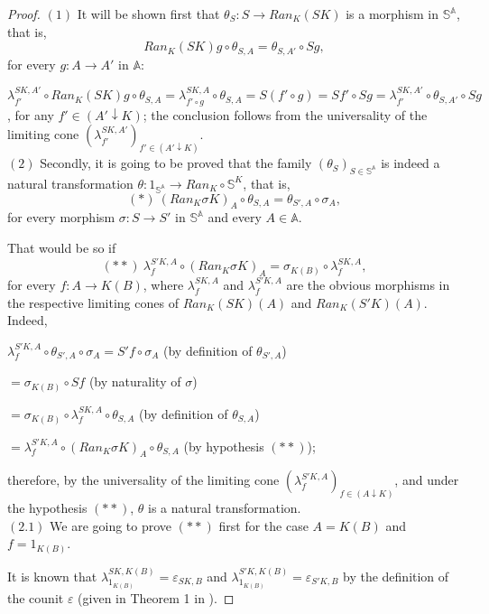 \documentclass[12pt,a4paper]{amsart}
\theoremstyle{definition}
\begin{document}
\begin{proof}$(1)$ It will be shown first that $\theta_S: S\rightarrow Ran_K(SK)$ is a morphism in $\mathbb{S}^\mathbb{A}$, that is, $$Ran_K(SK)g\circ\theta_{S,A}=\theta_{S,A'}\circ Sg,$$ for every $g:A\rightarrow A'$ in $\mathbb{A}$:\vspace{5pt}

$\lambda^{SK,A'}_{f'}\circ Ran_K(SK)g\circ\theta_{S,A}=\lambda^{SK,A}_{f'\circ g}\circ\theta_{S,A}=S(f'\circ g)=Sf'\circ Sg=\lambda^{SK,A'}_{f'}\circ\theta_{S,A'}\circ Sg$, for any $f'\in (A'\downarrow K)$; the conclusion follows from the universality of the limiting cone $(\lambda^{SK,A'}_{f'})_{f'\in (A'\downarrow K)}$.\\

$(2)$ Secondly, it is going to be proved that the family $(\theta_S)_{S\in\mathbb{S}^\mathbb{A}}$ is indeed a natural transformation $\theta :1_{\mathbb{S}^\mathbb{A}}\rightarrow Ran_K\circ \mathbb{S}^K$, that is, $$(*)\ (Ran_K\sigma K)_A\circ\theta_{S,A}=\theta_{S',A}\circ\sigma_A,$$ for every morphism $\sigma :S\rightarrow S'$ in $\mathbb{S}^\mathbb{A}$ and every $A\in\mathbb{A}$.

That would be so if $$(**)\ \lambda^{S'K,A}_f\circ (Ran_K\sigma K)_A=\sigma_{K(B)}\circ\lambda^{SK,A}_f,$$ for every $f:A\rightarrow K(B)$, where $\lambda^{SK,A}_f$ and $\lambda^{S'K,A}_f$ are the obvious morphisms in the respective limiting cones of $Ran_K(SK)(A)$ and $Ran_K(S'K)(A)$. Indeed,\vspace{5pt}

$\lambda^{S'K,A}_f\circ\theta_{S',A}\circ\sigma_A=S'f\circ\sigma_A$ (by definition of $\theta_{S',A}$)

$=\sigma_{K(B)}\circ Sf$ (by naturality of $\sigma$)

$=\sigma_{K(B)}\circ\lambda^{SK,A}_f\circ\theta_{S,A}$ (by definition of $\theta_{S,A}$)

$=\lambda^{S'K,A}_f\circ (Ran_K\sigma K)_A\circ\theta_{S,A}$ (by hypothesis $(**)$);

\noindent therefore, by the universality of the limiting cone $(\lambda^{S'K,A}_f)_{f\in (A\downarrow K)}$, and under the hypothesis $(**)$, $\theta$ is a natural transformation.\\

$(2.1)$ We are going to prove $(**)$ first for the case $A=K(B)$ and $f=1_{K(B)}$.

It is known that $\lambda^{SK,K(B)}_{1_{K(B)}}=\varepsilon_{SK,B}$ and $\lambda^{S'K,K(B)}_{1_{K(B)}}=\varepsilon_{S'K,B}$ by the definition of the counit $\varepsilon$ (given in Theorem 1 in \cite[\S X.3]{SM:cat}).


\end{proof}
\end{document}
